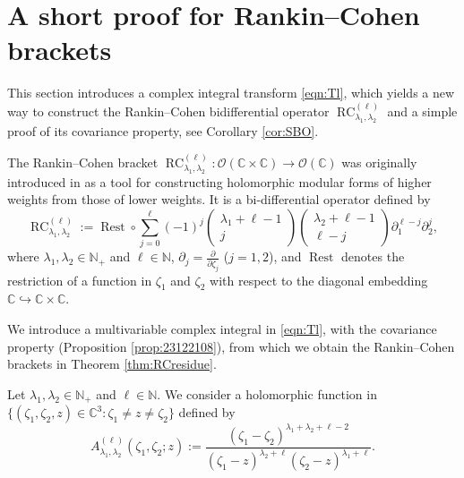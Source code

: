 \documentclass[12pt]{amsart}
\newcommand{\RC}{\operatorname{RC}}
\theoremstyle{plain} %
\theoremstyle{definition} %
\theoremstyle{remark} %
\begin{document}
\section{A short proof for Rankin--Cohen brackets}
\label{sec:RCshort}

This section introduces a complex integral transform 
 \eqref{eqn:Tl}, 
 which yields a new way to construct
 the Rankin--Cohen bidifferential operator
 $\RC_{\lambda_1, \lambda_2}^{(\ell)}$
 and a simple proof of its covariance property, 
 see Corollary \ref{cor:SBO}.  



The Rankin--Cohen bracket
$
  \RC_{\lambda_1, \lambda_2}^{(\ell)} \colon {\mathcal{O}}({\mathbb{C}} \times {\mathbb{C}}) \to {\mathcal{O}}({\mathbb{C}})
$
 was originally introduced in 
\cite{xCo75, xRa56}
as a tool for constructing holomorphic modular forms of higher weights from those of lower weights. 
It is a bi-differential operator
 defined by 
\begin{equation}\label{eqn:RC}
\RC_{\lambda_1, \lambda_2}^{(\ell)}
  := \operatorname{Rest} \circ \sum_{j=0}^{\ell} (-1)^j
\begin{pmatrix} \lambda_1+ \ell-1 \\ j \end{pmatrix}
\begin{pmatrix} \lambda_2+ \ell-1 \\ \ell-j \end{pmatrix}
 \partial_1^{\ell-j} \partial_2^{j}, 
\end{equation}
where $\lambda_1, \lambda_2 \in {\mathbb{N}}_+$ and $\ell \in {\mathbb{N}}$, 
 $\partial_j=\frac{\partial}{\partial \zeta_j}$ ($j=1,2$), 
 and $\operatorname{Rest}$ denotes the restriction
 of a function in $\zeta_1$ and $\zeta_2$
 with respect to the diagonal embedding ${\mathbb{C}} \hookrightarrow {\mathbb{C}} \times {\mathbb{C}}$.  



We introduce a multivariable complex integral in \eqref{eqn:Tl}, 
 with the covariance property
 (Proposition \ref{prop:23122108}), from which we obtain 
 the Rankin--Cohen brackets in Theorem \ref{thm:RCresidue}.  



Let $\lambda_1, \lambda_2 \in {\mathbb{N}}_+$
 and $\ell \in {\mathbb{N}}$.  
We consider a holomorphic function 
 in $\{(\zeta_1, \zeta_2, z) \in {\mathbb{C}}^3: \zeta_1 \ne z \ne \zeta_2\}$
 defined by 
\begin{equation}
\label{eqn:Al}
   A_{\lambda_1, \lambda_2}^{(\ell)}(\zeta_1, \zeta_2;z)
   :=
   \frac{(\zeta_1-\zeta_2)^{\lambda_1 + \lambda_2 + \ell -2}}
   {(\zeta_1-z)^{\lambda_2+ \ell}(\zeta_2-z)^{\lambda_1+\ell}}.  
\end{equation}
\end{document}
